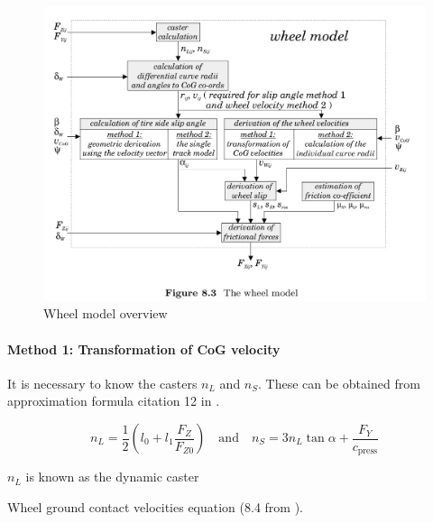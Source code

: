 \begin{figure}
    \centering
    \includegraphics[width=\textwidth]{draft/stolen-figures/wheel-model.png}
    \caption{Wheel model overview}
    \label{fig:wheel-model}
\end{figure}






\paragraph{Method 1: Transformation of CoG velocity}

It is necessary to know the casters $n_L$ and $n_S$. These can be obtained from approximation formula citation 12 in \cite{kiencke}.

\begin{equation}
    n_L = \frac{1}{2}\left( l_0 + l_1\frac{F_Z}{F_{Z0}} \right)
    \quad \text{and} \quad 
    n_S = 3 n_L \tan{\alpha} + \frac{F_Y}{c_\text{press}}
\end{equation}

$n_L$ is known as the dynamic caster 


Wheel ground contact velocities equation (8.4 from \cite{kiencke}).

